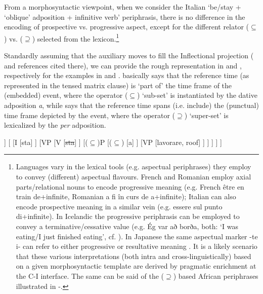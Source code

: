 \documentclass[output=paper,modfonts,nonflat,newtxmath,colorlinks,citecolor=brown]{langsci/langscibook}
\begin{document}
From a morphosyntactic viewpoint, when we consider the Italian ‘be/stay + ‘oblique’ adposition + infinitive verb’ periphrasis, there is no difference in the encoding of prospective {vs}. progressive aspect, except for the different relator  (${\subseteq}$) {vs}. (${\supseteq}$) selected from the lexicon.\footnote{Languages vary in the lexical tools (e.g. aspectual periphrases) they employ to convey (different) aspectual flavours. French and Romanian employ axial parts/relational nouns \citep{Svenonius2006axial} to encode progressive meaning (e.g. French {être en train de}+infinite, Romanian {a fi în curs de a}+infinite); Italian can also encode prospective meaning in a similar vein (e.g. {essere sul punto di+}infinite).  In Icelandic the progressive periphrasis can be employed to convey a terminative/cessative value (e.g. {Ég var að borða,} both: ‘I was eating/I just finished eating’, cf. \citealt{Johannsdottir2011}). In Japanese the same aspectual marker {{}-te i-} can refer to either progressive or resultative meaning \citep{Shirai1998}. It is a likely scenario that these various interpretations (both intra and cross-linguistically) based on a given morphosyntactic template are derived by pragmatic enrichment at the C-I interface. The same can be said of the (\textrm{${\supseteq}$}) based African periphrases illustrated in -.} 

Standardly assuming that the auxiliary moves to fill the Inflectional projection (\citealt{ManziniLorussoSavoia2017} and references cited there), we can provide the rough representation in  and , respectively for the examples in and .  basically says that the reference time (as represented in the tensed matrix clause) is ‘part of’ the time frame of the (embedded) event, where the operator (${\subseteq}$) ‘sub-set’  is instantiated by the dative adposition \textit{a}, while  says that the reference time spans (i.e. include) the (punctual) time frame depicted by the event, where the operator (${\supseteq}$) ‘super-set’ is lexicalized by the \textit{per} adposition.%

\ea%
    \label{ex:franco:25}
    \begin{forest}
    	[IP
    		[DP
    			[Gianni]
    		]
    		[
    			[I
    				[sta]
    			]
    			[VP
    				[V
    					[\sout{sta}]
    				]	
    				[($\subseteq$)P
    					[($\subseteq$)
    						[a]
    					]
    					[VP
    						[lavorare, roof]
    					]
    				]
    			]
    		]
    	]
    	\end{forest}
    \z
    
\end{document}

